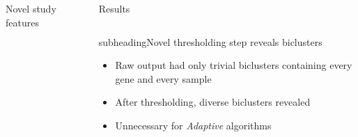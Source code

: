\documentclass[xcolor=table,final]{beamer}
\newlength{\sepwid}
\newlength{\onecolwid}
\newlength{\twocolwid}
\newcommand{\kcnsubheading}[1]{\begin{beamercolorbox}[rounded=true,sep=0.5ex]{subheading}{\large #1}\end{beamercolorbox}}
\begin{document}
\begin{frame}[t]
\begin{columns}[t]
\begin{column}{\onecolwid}
\begin{block}{Novel study features}
\end{block}





\end{column} %

\begin{column}{\sepwid}\end{column} %

\begin{column}{\twocolwid} %


\begin{block}{Results}
\end{block}
\vspace{-2.5cm}

\begin{columns}[t]
\begin{column}{\onecolwid}


\kcnsubheading{Novel thresholding step reveals biclusters}

\begin{itemize}
    \item Raw output had only trivial biclusters containing every gene and every sample
    \item After thresholding, diverse biclusters revealed
    \item Unnecessary for \textit{Adaptive} algorithms
\end{itemize}


\end{column}
\end{columns}
\end{column}
\end{columns}
\end{frame}
\end{document}
